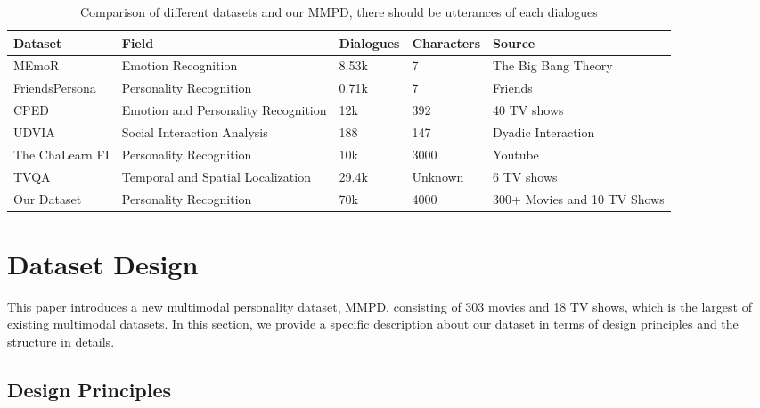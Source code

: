 \documentclass[11pt]{article}
\begin{document}
\begin{table*}
\centering
\begin{tabular}{lllll}
  \hline
  \textbf{Dataset} & \textbf{Field} & \textbf{Dialogues} & \textbf{Characters} & \textbf{Source}\\
  \hline
  MEmoR & Emotion Recognition & 8.53k & 7 & The Big Bang Theory \\
  \hline
  FriendsPersona & Personality Recognition & 0.71k & 7 & Friends\\
  \hline 
  CPED & Emotion and Personality Recognition & 12k & 392 & 40 TV shows\\
  \hline
  UDVIA & Social Interaction Analysis & 188 & 147 & Dyadic Interaction\\
  \hline
  The ChaLearn FI & Personality Recognition & 10k & 3000 & Youtube\\
  \hline
  TVQA & Temporal and Spatial Localization & 29.4k & Unknown & 6 TV shows\\
  \hline
  Our Dataset & Personality Recognition & 70k & 4000 & 300+ Movies and 10 TV Shows\\
  \hline
\end{tabular}
\caption{Comparison of different datasets and our MMPD, there should be utterances of each dialogues}
\label{tab:accents}
\end{table*}
\section{Dataset Design}

This paper introduces a new multimodal personality dataset, MMPD, consisting of 303 movies and 18 TV shows, which is the largest of existing multimodal datasets. In this section, we provide a specific description about our dataset in terms of design principles and the structure in details.

\subsection{Design Principles}
\end{document}
